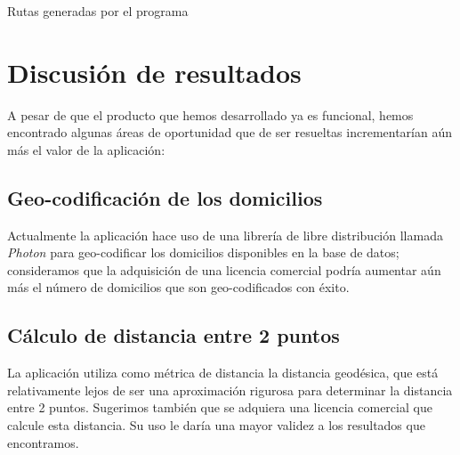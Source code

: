 \documentclass[journal]{IEEEtran}
\begin{document}
            \begin{table}[h!]
                \centering
                \caption{Rutas generadas por el programa}
                \label{rutas}
            \end{table}
            
    \section{Discusión de resultados} \label{discusion}
        
        A pesar de que el producto que hemos desarrollado ya es funcional, hemos encontrado algunas áreas de oportunidad que de ser resueltas incrementarían aún más el valor de la aplicación:
        
        \subsection{Geo-codificación de los domicilios}
            
            Actualmente la aplicación hace uso de una librería de libre distribución llamada \emph{Photon} para geo-codificar los domicilios disponibles en la base de datos; consideramos que la adquisición de una licencia comercial podría aumentar aún más el número de domicilios que son geo-codificados con éxito.
            
        \subsection{Cálculo de distancia entre 2 puntos}
            
            La aplicación utiliza como métrica de distancia la distancia geodésica, que está relativamente lejos de ser una aproximación rigurosa para determinar la distancia entre 2 puntos. Sugerimos también que se adquiera una licencia comercial que calcule esta distancia. Su uso le daría una mayor validez a los resultados que encontramos.
        
\end{document}
